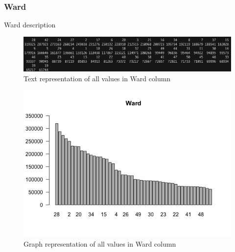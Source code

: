 \newpage
\subsubsection{Ward}
Ward description
\begin{figure}[H]
\includegraphics[scale=0.4]{images/EDA/Ward.jpg}
\centering
\caption{Text representation of all values in Ward column}
\end{figure}
\begin{figure}[H]
\includegraphics[scale=0.7]{images/EDA/Ward.png}
\centering
\caption{Graph representation of all values in Ward column}
\end{figure}